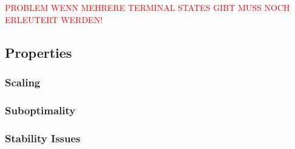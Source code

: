 \textcolor{red}{PROBLEM WENN MEHRERE TERMINAL STATES GIBT MUSS NOCH ERLEUTERT WERDEN!}

\subsection{Properties}\label{subsec:MultiScale_properties}
\subsubsection{Scaling}
\subsubsection{Suboptimality}
\subsubsection{Stability Issues}

